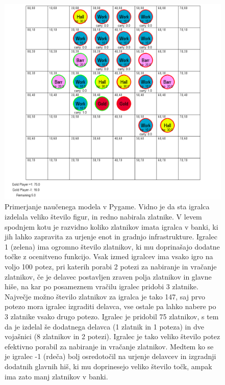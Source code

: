\documentclass[a4paper, 12pt]{book}
\begin{document}
\begin{figure}[h]
	\begin{center}
		\includegraphics[width=1\textwidth]{photos/pit_100_game1.pdf}
	\end{center}
	\caption{Primerjanje naučenega modela v Pygame. Vidno je da sta igralca izdelala veliko število figur, in redno nabirala zlatnike. 
		V levem spodnjem kotu je razvidno koliko zlatnikov imata igralca v banki, ki jih lahko zapravita za urjenje enot in gradnjo infrastrukture.
		Igralec 1 (zelena) ima ogromno število zlatnikov, ki mu doprinašajo dodatne točke z ocenitveno funkcijo.
		Vsak izmed igralcev ima vsako igro na voljo 100 potez, pri katerih porabi 2 potezi za nabiranje in vračanje zlatnikov, če je delavec postavljen zraven polja zlatnikov in glavne hiše, na kar po posameznem vračilu igralec pridobi 3 zlatnike. Največje možno število zlatnikov za igralca je tako 147, saj prvo potezo mora igralec izgraditi delavca, vse ostale pa lahko nabere po 3 zlatnike vsako drugo potezo.
		Igralec je pridobil 75 zlatnikov, s tem da je izdelal še dodatnega delavca (1 zlatnik in 1 poteza) in dve vojašnici (8 zlatnikov in 2 potezi).
	Igralec je tako veliko število potez efektivno porabil za nabiranje in vračanje zlatnikov.	Medtem ko se je igralec -1 (rdeča) bolj osredotočil na urjenje delavcev in izgradnji dodatnih glavnih hiš, ki mu doprinesejo veliko število točk, ampak ima zato manj zlatnikov v banki.}
	\label{pit_100_game1}
\end{figure}
\end{document}
